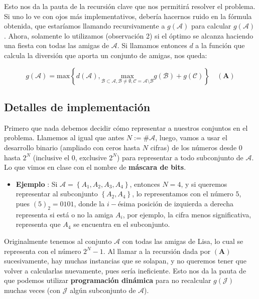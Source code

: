 Esto nos da la pauta de la recursión clave que nos permitirá resolver el problema. Si uno lo ve con ojos más implementativos, debería hacernos ruido en la fórmula obtenida, que estaríamos llamando recursivamente a $g(\mathcal{A})$ para calcular $g(\mathcal{A})$. Ahora, solamente lo utilizamos (observación 2) si el óptimo se alcanza haciendo una fiesta con todas las amigas de $\mathcal{A}$. Si llamamos entonces $d$ a la función que calcula la diversión que aporta un conjunto de amigas, nos queda:

$$ \boxed{g(\mathcal{A}) =  \text{max} \left \{ d(\mathcal{A}),\underset{\mathcal{B} \subset \mathcal{A}, \mathcal{B} \neq \emptyset, \mathcal{C} = \mathcal{A} \setminus \mathcal{B}}{\text{max}} g(\mathcal{B}) + g(\mathcal{C}) \right \} } \quad  (\mathbf{A}) $$


\subsection{Detalles de implementación}

Primero que nada debemos decidir cómo representar a nuestros conjuntos en el problema. Llamemos al igual que antes $ N := \# \mathcal{A}$, luego, vamos a usar el desarrollo binario (ampliado con ceros hasta $N$ cifras) de los números desde $0$ hasta $2^N$ (inclusive el $0$, exclusive $2^N$) para representar a todo subconjunto de $\mathcal{A}$. Lo que vimos en clase con el nombre de \textbf{máscara de bits}.

\begin{itemize}
	\item \textbf{Ejemplo} : Si $\mathcal{A} = \left \{ A_1, A_2, A_3, A_4 \right \}$, entonces $ N = 4$, y si queremos representar al subconjunto $ \left \{ A_2, A_4 \right \}$, lo representamos con el número $5$, pues $(5)_2 = 0101$, donde la $i-$ésima posición de izquierda a derecha representa si está o no la amiga $A_i$, por ejemplo, la cifra menos significativa, representa que $A_4$ se encuentra en el subconjunto.
\end{itemize}

Originalmente tenemos al conjunto $\mathcal{A}$ con todas las amigas de Lisa, lo cual se representa con el número $2^N-1$. Al llamar a la recursión dada por $(\mathbf{A})$ sucesivamente, hay muchas instancias que se solapan, y no queremos tener que volver a calcularlas nuevamente, pues sería ineficiente. Esto nos da la pauta de que podemos utilizar \textbf{programación dinámica} para no recalcular $g(\mathcal{J})$ muchas veces (con $\mathcal{J}$ algún subconjunto de $\mathcal{A}$).

